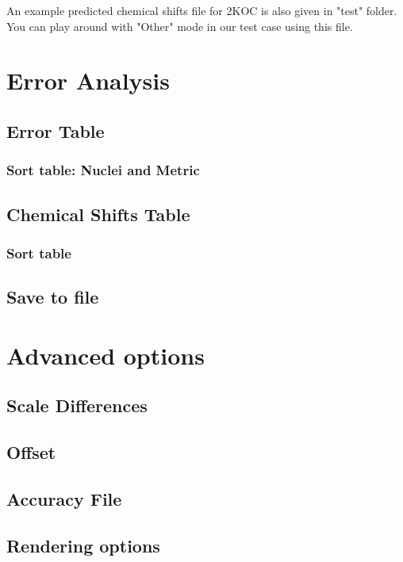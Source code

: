 \documentclass{article}
\begin{document}
An example predicted chemical shifts file for 2KOC is also given in "test" folder. You can play around with "Other" mode in our test case using this file.

\newpage
\section{Error Analysis}
\subsection{Error Table}
\subsubsection{Sort table: Nuclei and Metric}
\subsection{Chemical Shifts Table}
\subsubsection{Sort table}
\subsection{Save to file}


\newpage
\section{Advanced options}
\subsection{Scale Differences}
\subsection{Offset}
\subsection{Accuracy File}
\subsection{Rendering options}
\end{document}
